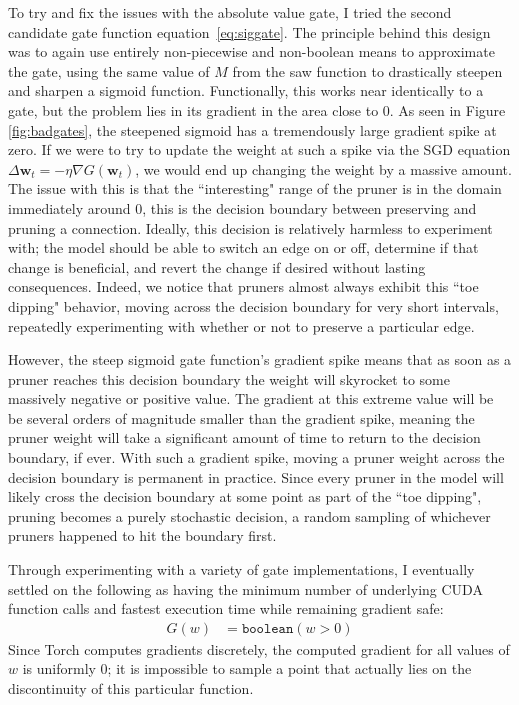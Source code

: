 To try and fix the issues with the absolute value gate, I tried the second candidate gate function
equation~\ref{eq:siggate}. The principle behind this design was to again use entirely non-piecewise and non-boolean means
to approximate the gate, using the same value of $M$ from the saw function to drastically steepen and sharpen a sigmoid
function. Functionally, this works near identically to a gate, but the problem lies in its gradient in the area
close to 0. As seen in Figure \ref{fig:badgates}, the steepened sigmoid has a tremendously large gradient spike at zero.
If we were to try to update the weight at such a spike via the SGD equation
$\Delta \mathbf{w}_t = - \eta \nabla \mathit{G}(\mathbf{w}_t)$, we would end up changing the weight by a massive amount.
The issue with this is that the ``interesting" range of the pruner is in the domain immediately around 0, this is the decision
boundary between preserving and pruning a connection. Ideally, this decision is relatively harmless to experiment with; the model
should be able to switch an edge on or off, determine if that change is beneficial, and revert the change if desired without
lasting consequences. Indeed, we notice that pruners almost always exhibit this ``toe dipping"  behavior, moving across
the decision boundary for very short intervals, repeatedly experimenting with whether or not to preserve a particular edge.

However, the steep sigmoid gate function's gradient spike means that as soon as a pruner reaches this decision boundary
the weight will skyrocket to some massively negative or positive value.
The gradient at this extreme value will be be several orders of magnitude smaller than the gradient spike,
meaning the pruner weight will take a significant amount of time to return to the decision boundary, if ever. With such a gradient spike, moving a pruner weight across the decision boundary is permanent in practice. Since every pruner in the model will likely
cross the decision boundary at some point as part of the ``toe dipping", pruning becomes a purely stochastic decision, a
random sampling of whichever pruners happened to hit the boundary first.

Through experimenting with a variety of gate implementations, I eventually settled on the following as having the minimum
number of underlying CUDA function calls and fastest execution time while remaining gradient safe:
\begin{align}
	G(w) &=  \texttt{boolean}(w > 0)
\end{align}
Since Torch computes gradients discretely, the computed gradient for all values of $w$ is uniformly 0;
it is impossible to sample a point that actually lies on the discontinuity of this particular function.

